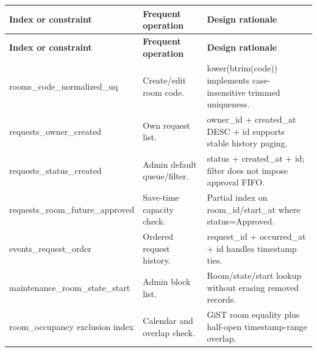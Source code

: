 \begin{longtable}{|p{}|p{}|p{}|}

\hline

\textbf{Index or constraint} & \textbf{Frequent operation} & \textbf{Design rationale} \\ \hline

\endfirsthead

\hline

\textbf{Index or constraint} & \textbf{Frequent operation} & \textbf{Design rationale} \\ \hline

\endhead

rooms\allowbreak\_\allowbreak{}code\allowbreak\_\allowbreak{}normalized\allowbreak\_\allowbreak{}uq & Create/\allowbreak{}edit room code. & lower(btrim(code)) implements case-insensitive trimmed uniqueness. \\ \hline

requests\allowbreak\_\allowbreak{}owner\allowbreak\_\allowbreak{}created & Own request list. & owner\allowbreak\_\allowbreak{}id + created\allowbreak\_\allowbreak{}at DESC + id supports stable history paging. \\ \hline

requests\allowbreak\_\allowbreak{}status\allowbreak\_\allowbreak{}created & Admin default queue/\allowbreak{}filter. & status + created\allowbreak\_\allowbreak{}at + id; filter does not impose approval FIFO. \\ \hline

requests\allowbreak\_\allowbreak{}room\allowbreak\_\allowbreak{}future\allowbreak\_\allowbreak{}approved & Save-time capacity check. & Partial index on room\allowbreak\_\allowbreak{}id/\allowbreak{}start\allowbreak\_\allowbreak{}at where status=Approved. \\ \hline

events\allowbreak\_\allowbreak{}request\allowbreak\_\allowbreak{}order & Ordered request history. & request\allowbreak\_\allowbreak{}id + occurred\allowbreak\_\allowbreak{}at + id handles timestamp ties. \\ \hline

maintenance\allowbreak\_\allowbreak{}room\allowbreak\_\allowbreak{}state\allowbreak\_\allowbreak{}start & Admin block list. & Room/\allowbreak{}state/\allowbreak{}start lookup without erasing removed records. \\ \hline

room\allowbreak\_\allowbreak{}occupancy exclusion index & Calendar and overlap check. & GiST room equality plus half-open timestamp-range overlap. \\ \hline


\end{longtable}
